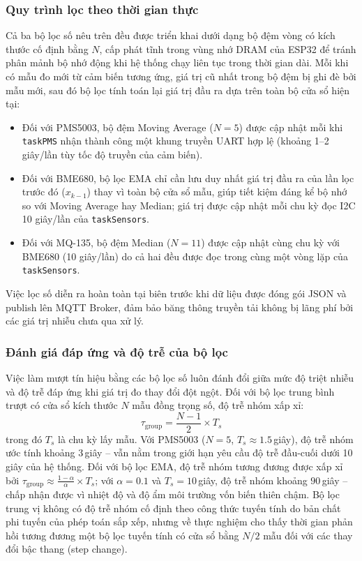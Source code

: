 \documentclass[12pt,a4paper]{article}
\begin{document}
\subsubsection{Quy trình lọc theo thời gian thực}
Cả ba bộ lọc số nêu trên đều được triển khai dưới dạng bộ đệm vòng có kích thước cố định bằng $N$, cấp phát tĩnh trong vùng nhớ DRAM của ESP32 để tránh phân mảnh bộ nhớ động khi hệ thống chạy liên tục trong thời gian dài. Mỗi khi có mẫu đo mới từ cảm biến tương ứng, giá trị cũ nhất trong bộ đệm bị ghi đè bởi mẫu mới, sau đó bộ lọc tính toán lại giá trị đầu ra dựa trên toàn bộ cửa sổ hiện tại:
\begin{itemize}
    \item Đối với PMS5003, bộ đệm Moving Average ($N=5$) được cập nhật mỗi khi \texttt{taskPMS} nhận thành công một khung truyền UART hợp lệ (khoảng 1--2 giây/lần tùy tốc độ truyền của cảm biến).
    \item Đối với BME680, bộ lọc EMA chỉ cần lưu duy nhất giá trị đầu ra của lần lọc trước đó ($x_{k-1}$) thay vì toàn bộ cửa sổ mẫu, giúp tiết kiệm đáng kể bộ nhớ so với Moving Average hay Median; giá trị được cập nhật mỗi chu kỳ đọc I2C 10 giây/lần của \texttt{taskSensors}.
    \item Đối với MQ-135, bộ đệm Median ($N=11$) được cập nhật cùng chu kỳ với BME680 (10 giây/lần) do cả hai đều được đọc trong cùng một vòng lặp của \texttt{taskSensors}.
\end{itemize}
Việc lọc số diễn ra hoàn toàn tại biên trước khi dữ liệu được đóng gói JSON và publish lên MQTT Broker, đảm bảo băng thông truyền tải không bị lãng phí bởi các giá trị nhiễu chưa qua xử lý.

\subsubsection{Đánh giá đáp ứng và độ trễ của bộ lọc}
Việc làm mượt tín hiệu bằng các bộ lọc số luôn đánh đổi giữa mức độ triệt nhiễu và độ trễ đáp ứng khi giá trị đo thay đổi đột ngột. Đối với bộ lọc trung bình trượt có cửa sổ kích thước $N$ mẫu đồng trọng số, độ trễ nhóm xấp xỉ:
\[
\tau_{\text{group}} = \frac{N-1}{2} \times T_s
\]
trong đó $T_s$ là chu kỳ lấy mẫu. Với PMS5003 ($N=5$, $T_s \approx 1.5$\,giây), độ trễ nhóm ước tính khoảng $3$\,giây -- vẫn nằm trong giới hạn yêu cầu độ trễ đầu-cuối dưới 10 giây của hệ thống. Đối với bộ lọc EMA, độ trễ nhóm tương đương được xấp xỉ bởi $\tau_{\text{group}} \approx \frac{1-\alpha}{\alpha} \times T_s$; với $\alpha = 0.1$ và $T_s = 10$\,giây, độ trễ nhóm khoảng $90$\,giây -- chấp nhận được vì nhiệt độ và độ ẩm môi trường vốn biến thiên chậm. Bộ lọc trung vị không có độ trễ nhóm cố định theo công thức tuyến tính do bản chất phi tuyến của phép toán sắp xếp, nhưng về thực nghiệm cho thấy thời gian phản hồi tương đương một bộ lọc tuyến tính có cửa sổ bằng $N/2$ mẫu đối với các thay đổi bậc thang (step change).
\end{document}
